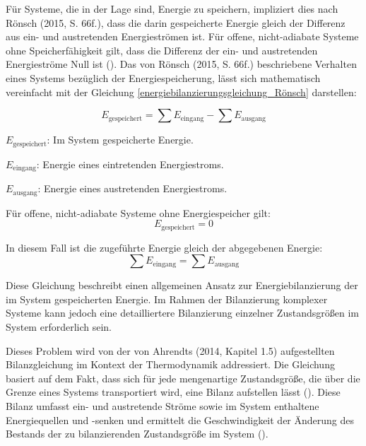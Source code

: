 Für Systeme, die in der Lage sind, Energie zu speichern, impliziert dies nach Rönsch (2015, S. 66f.), 
dass die darin gespeicherte Energie gleich der Differenz aus ein- und austretenden Energieströmen ist. 
Für offene, nicht-adiabate Systeme ohne Speicherfähigkeit gilt, dass die Differenz der ein- und austretenden Energieströme Null ist 
(\cite[S. 66f.]{Rönsch.2015}).
Das von Rönsch (2015, S. 66f.) beschriebene Verhalten eines Systems bezüglich der Energiespeicherung, lässt sich mathematisch 
vereinfacht mit der Gleichung \eqref{energiebilanzierungsgleichung_Rönsch} darstellen:

\begin{equation}
E_{\text{gespeichert}} = \sum E_{\text{eingang}} - \sum E_{\text{ausgang}}
\label{energiebilanzierungsgleichung_Rönsch}
\end{equation}

\begin{description}
    \item \(E_{\text{gespeichert}}\): Im System gespeicherte Energie.
    \item \(E_{\text{eingang}}\): Energie eines eintretenden Energiestroms.
    \item \(E_{\text{ausgang}}\): Energie eines austretenden Energiestroms.
    \item Für offene, nicht-adiabate Systeme ohne Energiespeicher gilt:
    \[
    E_{\text{gespeichert}} = 0
    \]
    \item In diesem Fall ist die zugeführte Energie gleich der abgegebenen Energie:
    \[
    \sum E_{\text{eingang}} = \sum E_{\text{ausgang}}
    \]
\end{description}

Diese Gleichung beschreibt einen allgemeinen Ansatz zur Energiebilanzierung der im System gespeicherten Energie. 
Im Rahmen der Bilanzierung komplexer Systeme kann jedoch eine detailliertere Bilanzierung einzelner Zustandsgrößen im System erforderlich sein.

Dieses Problem wird von der von Ahrendts (2014, Kapitel 1.5) aufgestellten Bilanzgleichung im Kontext der Thermodynamik addressiert. 
Die Gleichung basiert auf dem Fakt, dass sich für jede mengenartige Zustandsgröße, die über die Grenze eines Systems transportiert wird, eine 
Bilanz aufstellen lässt (\cite[Kapitel 1.5]{Ahrendts.2014}). 
Diese Bilanz umfasst ein- und austretende Ströme sowie im System enthaltene Energiequellen und -senken und ermittelt die 
Geschwindigkeit der Änderung des Bestands der zu bilanzierenden Zustandsgröße im System (\cite[Kapitel 1.5]{Ahrendts.2014}).

